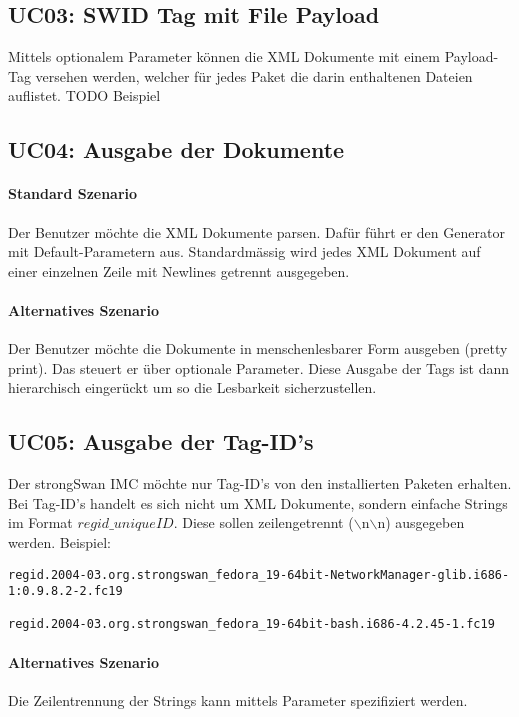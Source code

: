 \subsection{UC03: SWID Tag mit File Payload}
Mittels optionalem Parameter können die XML Dokumente mit einem Payload-Tag versehen werden, welcher für jedes Paket die darin enthaltenen Dateien auflistet.
TODO Beispiel

\subsection{UC04: Ausgabe der Dokumente}

\paragraph{Standard Szenario}
Der Benutzer möchte die XML Dokumente parsen. Dafür führt er den Generator mit
Default-Parametern aus. Standardmässig wird jedes XML Dokument auf einer einzelnen Zeile
mit Newlines getrennt ausgegeben.

\paragraph{Alternatives Szenario}
Der Benutzer möchte die Dokumente in menschenlesbarer Form ausgeben (pretty
print). Das steuert er über optionale Parameter. Diese Ausgabe der Tags ist dann
hierarchisch eingerückt um so die Lesbarkeit sicherzustellen.

\subsection{UC05: Ausgabe der Tag-ID's}
Der strongSwan IMC möchte nur Tag-ID's von den installierten Paketen erhalten. Bei Tag-ID's handelt es sich nicht um XML Dokumente, sondern einfache Strings im Format $regid\_uniqueID $. Diese sollen zeilengetrennt ($\backslash$n$\backslash$n) ausgegeben werden. Beispiel:\\
\begin{verbatim}
regid.2004-03.org.strongswan_fedora_19-64bit-NetworkManager-glib.i686-1:0.9.8.2-2.fc19

regid.2004-03.org.strongswan_fedora_19-64bit-bash.i686-4.2.45-1.fc19
\end{verbatim}
\paragraph{Alternatives Szenario}
Die Zeilentrennung der Strings kann mittels Parameter spezifiziert werden.

